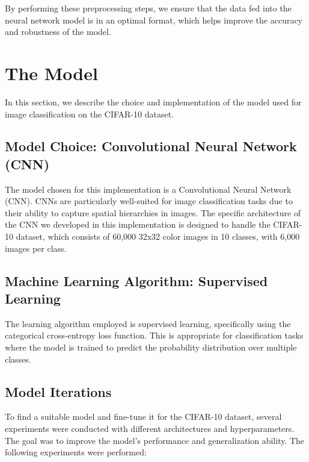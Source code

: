 \documentclass{article}
\begin{document}
By performing these preprocessing steps, we ensure that the data fed into the neural network model is in an optimal format, which helps improve the accuracy and robustness of the model.


\section{The Model}

In this section, we describe the choice and implementation of the model used for image classification on the CIFAR-10 dataset.

\subsection{Model Choice: Convolutional Neural Network (CNN)}

The model chosen for this implementation is a Convolutional Neural Network (CNN). CNNs are particularly well-suited for image classification tasks due to their ability to capture spatial hierarchies in images. The specific architecture of the CNN we developed in this implementation is designed to handle the CIFAR-10 dataset, which consists of 60,000 32x32 color images in 10 classes, with 6,000 images per class.

\subsection{Machine Learning Algorithm: Supervised Learning}

The learning algorithm employed is supervised learning, specifically using the categorical cross-entropy loss function. This is appropriate for classification tasks where the model is trained to predict the probability distribution over multiple classes.

\subsection{Model Iterations}

To find a suitable model and fine-tune it for the CIFAR-10 dataset, several experiments were conducted with different architectures and hyperparameters. The goal was to improve the model's performance and generalization ability. The following experiments were performed:
\end{document}
